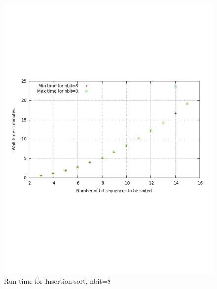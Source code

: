 \documentclass[12pt]{article}
\begin{document}
\begin{figure} %
\centering
\includegraphics[width=12cm]{fsort5.pdf} 
\caption{Run time for Insertion sort, nbit=8} 
\label{fig:image_sf5} %
\end{figure}
\end{document}
